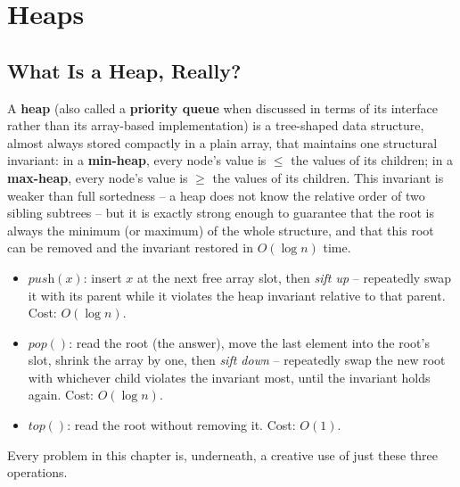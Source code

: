 \chapter{Heaps}

\section{What Is a Heap, Really?}
\label{sec:heap-intro}

A \textbf{heap} (also called a \textbf{priority queue} when discussed in
terms of its interface rather than its array-based implementation) is a
tree-shaped data structure, almost always stored compactly in a plain
array, that maintains one structural invariant: in a \textbf{min-heap},
every node's value is $\le$ the values of its children; in a
\textbf{max-heap}, every node's value is $\ge$ the values of its children.
This invariant is weaker than full sortedness -- a heap does not know the
relative order of two sibling subtrees -- but it is exactly strong enough
to guarantee that the root is always the minimum (or maximum) of the whole
structure, and that this root can be removed and the invariant restored in
$O(\log n)$ time.

\begin{ideabox}
\begin{itemize}
  \item $\textit{push}(x)$: insert $x$ at the next free array slot, then
        \emph{sift up} -- repeatedly swap it with its parent while it
        violates the heap invariant relative to that parent. Cost:
        $O(\log n)$.
  \item $\textit{pop}()$: read the root (the answer), move the last
        element into the root's slot, shrink the array by one, then
        \emph{sift down} -- repeatedly swap the new root with whichever
        child violates the invariant most, until the invariant holds
        again. Cost: $O(\log n)$.
  \item $\textit{top}()$: read the root without removing it. Cost: $O(1)$.
\end{itemize}
Every problem in this chapter is, underneath, a creative use of just these
three operations.
\end{ideabox}


